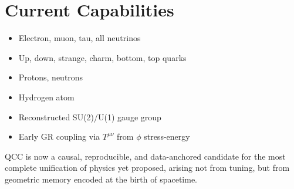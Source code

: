 \documentclass[12pt]{article}
\begin{document}
\section*{Current Capabilities}
\begin{itemize}
\item Electron, muon, tau, all neutrinos
\item Up, down, strange, charm, bottom, top quarks
\item Protons, neutrons
\item Hydrogen atom
\item Reconstructed SU(2)/U(1) gauge group
\item Early GR coupling via $T^{\mu\nu}$ from $\phi$ stress-energy
\end{itemize}

QCC is now a causal, reproducible, and data-anchored candidate for the most complete unification of physics yet proposed, arising not from tuning, but from geometric memory encoded at the birth of spacetime.
\end{document}
